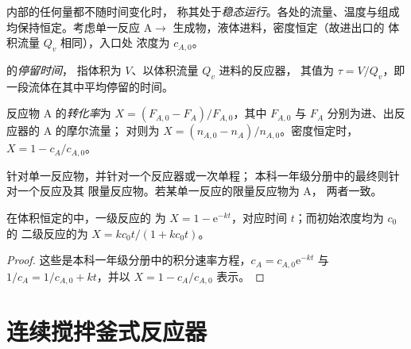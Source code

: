 内部的任何量都不随时间变化时，
称其处于\emph{稳态运行}。各处的流量、温度与组成
均保持恒定。考虑单一反应
$\mathrm A \to$ 生成物，液体进料，密度恒定（故进出口的
体积流量 $Q_v$ 相同），入口处
浓度为 $c_{A,0}$。

\begin{definition}[停留时间]\label{def:b2:continuous-reactors:residence-time}
的\emph{停留时间}，
指体积为 $V$、以体积流量 $Q_v$ 进料的反应器，
其值为 $\tau = V/Q_v$，即一段流体在其中平均停留的时间。
\end{definition}

\begin{definition}[转化率]\label{def:b2:continuous-reactors:conversion}
反应物 A 的\emph{转化率}为 $X = (F_{A,0} -
F_A)/F_{A,0}$，其中 $F_{A,0}$ 与 $F_A$ 分别为进、出反应器的 A 的摩尔流量；
对则为 $X = (n_{A,0} -
n_A)/n_{A,0}$。密度恒定时，$X = 1 - c_A/c_{A,0}$。
\end{definition}

针对单一反应物，并针对一个反应器或一次单程；
本科一年级分册中的最终则针对一个反应及其
限量反应物。若某单一反应的限量反应物为 A，
两者一致。

\begin{proposition}[间歇反应器]\label{prop:b2:continuous-reactors:batch}
在体积恒定的中，一级反应的
为 $X = 1 - \mathrm e^{-kt}$，对应时间 $t$；而初始浓度均为 $c_0$ 的
二级反应的为 $X =
kc_0t/(1 + kc_0t)$。
\end{proposition}

\begin{proof}
这些是本科一年级分册中的积分速率方程，$c_A = c_{A,0}
\mathrm e^{-kt}$ 与 $1/c_A = 1/c_{A,0} + kt$，并以 $X = 1 -
c_A/c_{A,0}$ 表示。
\end{proof}

\section{连续搅拌釜式反应器}

